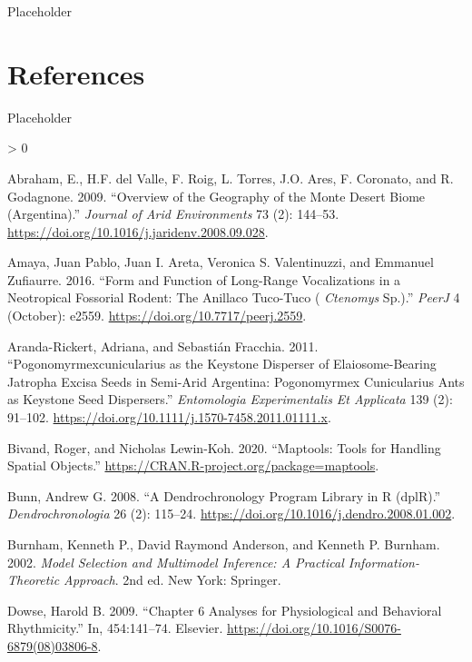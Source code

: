 \documentclass[english,msc,numbers,hidelinks]{coppe}
\newlength{\cslhangindent}
\newenvironment{CSLReferences}[2] %
 {%
  \setlength{\parindent}{0pt}
  \ifodd #1 \everypar{\setlength{\hangindent}{\cslhangindent}}\ignorespaces\fi
  \ifnum #2 > 0
  \setlength{\parskip}{#2\baselineskip}
  \fi
 }%
 {}
\begin{document}
  Placeholder

  \hypertarget{references}{%
  \chapter*{References}\label{references}}

  Placeholder

  \hypertarget{refs}{}
  \begin{CSLReferences}{1}{0}
  \leavevmode\hypertarget{ref-abraham2009}{}%
  Abraham, E., H.F. del Valle, F. Roig, L. Torres, J.O. Ares, F. Coronato, and R. Godagnone. 2009. {``Overview of the Geography of the Monte Desert Biome (Argentina).''} \emph{Journal of Arid Environments} 73 (2): 144--53. \url{https://doi.org/10.1016/j.jaridenv.2008.09.028}.

  \leavevmode\hypertarget{ref-amaya2016}{}%
  Amaya, Juan Pablo, Juan I. Areta, Veronica S. Valentinuzzi, and Emmanuel Zufiaurre. 2016. {``Form and Function of Long-Range Vocalizations in a Neotropical Fossorial Rodent: The Anillaco Tuco-Tuco ( {\emph{Ctenomys}} Sp.).''} \emph{PeerJ} 4 (October): e2559. \url{https://doi.org/10.7717/peerj.2559}.

  \leavevmode\hypertarget{ref-aranda-rickert2011a}{}%
  Aranda-Rickert, Adriana, and Sebastián Fracchia. 2011. {``Pogonomyrmexcunicularius as the Keystone Disperser of Elaiosome-Bearing Jatropha Excisa Seeds in Semi-Arid Argentina: Pogonomyrmex Cunicularius Ants as Keystone Seed Dispersers.''} \emph{Entomologia Experimentalis Et Applicata} 139 (2): 91--102. \url{https://doi.org/10.1111/j.1570-7458.2011.01111.x}.

  \leavevmode\hypertarget{ref-bivand2020}{}%
  Bivand, Roger, and Nicholas Lewin-Koh. 2020. {``Maptools: Tools for Handling Spatial Objects.''} \url{https://CRAN.R-project.org/package=maptools}.

  \leavevmode\hypertarget{ref-bunn2008}{}%
  Bunn, Andrew G. 2008. {``A Dendrochronology Program Library in R (dplR).''} \emph{Dendrochronologia} 26 (2): 115--24. \url{https://doi.org/10.1016/j.dendro.2008.01.002}.

  \leavevmode\hypertarget{ref-burnham2002}{}%
  Burnham, Kenneth P., David Raymond Anderson, and Kenneth P. Burnham. 2002. \emph{Model Selection and Multimodel Inference: A Practical Information-Theoretic Approach}. 2nd ed. New York: Springer.

  \leavevmode\hypertarget{ref-dowse2009}{}%
  Dowse, Harold B. 2009. {``Chapter 6 Analyses for Physiological and Behavioral Rhythmicity.''} In, 454:141--74. Elsevier. \url{https://doi.org/10.1016/S0076-6879(08)03806-8}.


\end{CSLReferences}
\end{document}
